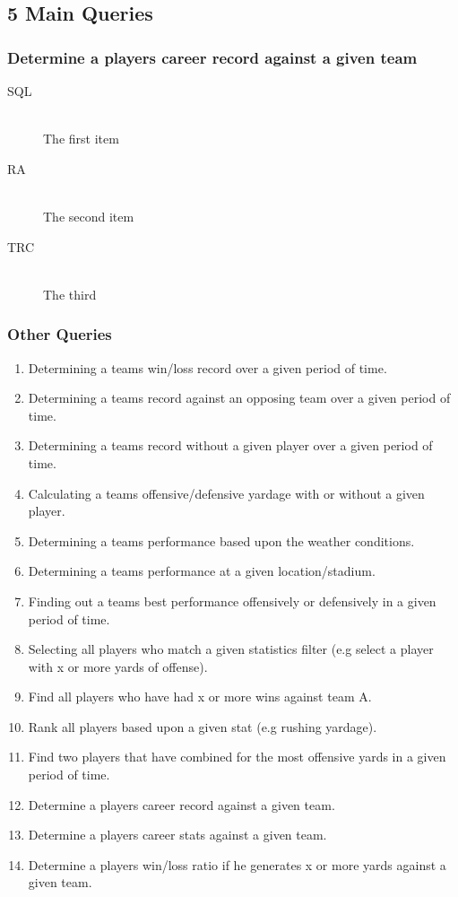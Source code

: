 \documentclass[12pt,letterpaper]{article}
\begin{document}
\subsection{5 Main Queries}

\subsubsection{Determine a players career record against a given team}
\begin{description}
  \item[SQL] \hfill \\
  The first item
  \item[RA] \hfill \\
  The second item
  \item[TRC] \hfill \\
  The third
\end{description}

\subsubsection{Other Queries}

\begin{enumerate}
\item Determining a teams win/loss record over a given period of time.
\item Determining a teams record against an opposing team over a given period of time.
\item Determining a teams record without a given player over a given period of time.
\item Calculating a teams offensive/defensive yardage with or without a given player.
\item Determining a teams performance based upon the weather conditions.
\item Determining a teams performance at a given location/stadium.
\item Finding out a teams best performance offensively or defensively in a given period of time.
\item Selecting all players who match a given statistics filter (e.g select a player with x or more yards of offense).
\item Find all players who have had x or more wins against team A.
\item Rank all players based upon a given stat (e.g rushing yardage).
\item Find two players that have combined for the most offensive yards in a given period of time.
\item Determine a players career record against a given team.
\item Determine a players career stats against a given team.
\item Determine a players win/loss ratio if he generates x or more yards against a given team.
\end{enumerate}
\end{document}
